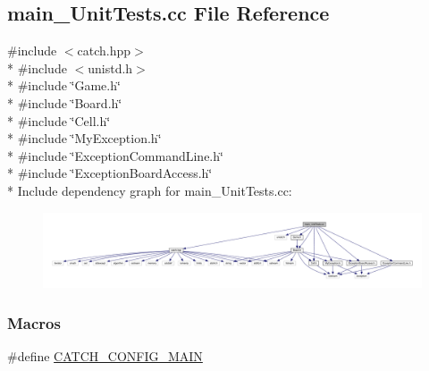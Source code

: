 \hypertarget{a00109}{}\subsection{main\+\_\+\+Unit\+Tests.\+cc File Reference}
\label{a00109}
{\ttfamily \#include $<$catch.\+hpp$>$}\\*
{\ttfamily \#include $<$unistd.\+h$>$}\\*
{\ttfamily \#include \char`\"{}Game.\+h\char`\"{}}\\*
{\ttfamily \#include \char`\"{}Board.\+h\char`\"{}}\\*
{\ttfamily \#include \char`\"{}Cell.\+h\char`\"{}}\\*
{\ttfamily \#include \char`\"{}My\+Exception.\+h\char`\"{}}\\*
{\ttfamily \#include \char`\"{}Exception\+Command\+Line.\+h\char`\"{}}\\*
{\ttfamily \#include \char`\"{}Exception\+Board\+Access.\+h\char`\"{}}\\*
Include dependency graph for main\+\_\+\+Unit\+Tests.\+cc\+:\nopagebreak
\begin{figure}[H]
\begin{center}
\leavevmode
\includegraphics[width=350pt]{a00144}
\end{center}
\end{figure}
\subsubsection*{Macros}
\begin{DoxyCompactItemize}
\item 
\#define \hyperlink{a00109_a656eb5868e824d59f489f910db438420}{C\+A\+T\+C\+H\+\_\+\+C\+O\+N\+F\+I\+G\+\_\+\+M\+A\+I\+N}
\end{DoxyCompactItemize}
